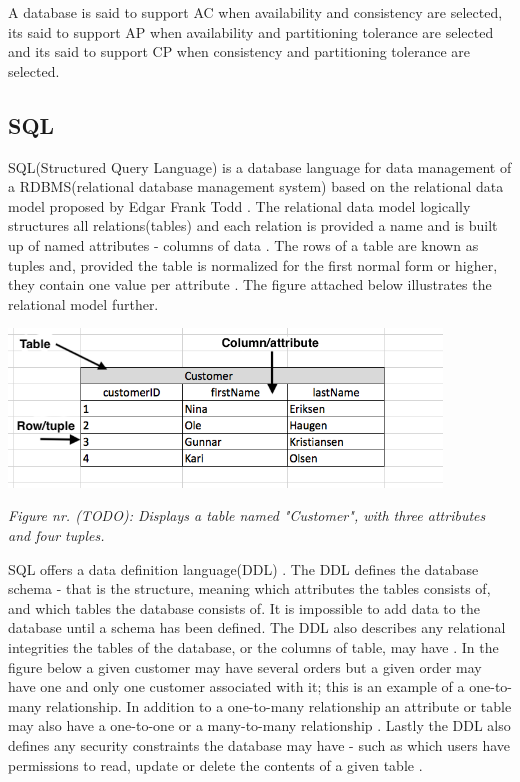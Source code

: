 A database is said to support AC when availability and consistency are selected, its said to support AP when availability and partitioning tolerance are selected and its said to support CP when consistency and partitioning tolerance are selected.
\fi

\subsection{SQL} 
SQL(Structured Query Language) is a database language for data management\cite{sql-goal} of a RDBMS(relational database management system) \cite{sql-is-a-rdbms} based on the relational data model proposed by Edgar Frank Todd \cite{rdbms}.
The relational data model logically structures all relations(tables) and each relation is provided a name and is built up of named attributes - columns of data \cite{sql-is-a-rdbms}.
The rows of a table are known as tuples \cite{sql-is-a-rdbms} and, provided the table is normalized for the first normal form or higher, they contain one value per attribute \cite{sql-1nf}.
The figure attached below illustrates the relational model further.

\includegraphics[width=115mm,scale=1]{figures/relational-db-visualised.png}

\textit{Figure nr. (TODO): Displays a table named "Customer", with three attributes and four tuples.}

SQL offers a data definition language(DDL) \cite{sql-components}.
The DDL defines the database schema - that is the structure, meaning which attributes the tables consists of, and which tables the database consists of.
It is impossible to add data to the database until a schema has been defined.
The DDL also describes any relational integrities the tables of the database, or the columns of table, may have \cite{sql-constraints}.
In the figure below a given customer may have several orders but a given order may have one and only one customer associated with it; this is an example of a one-to-many relationship.
In addition to a one-to-many relationship an attribute or table may also have a one-to-one or a many-to-many relationship \cite{sql-relationships}.
Lastly the DDL also defines any security constraints the database may have - such as which users have permissions to read, update or delete the contents of a given table \cite{sql-ddl}.

